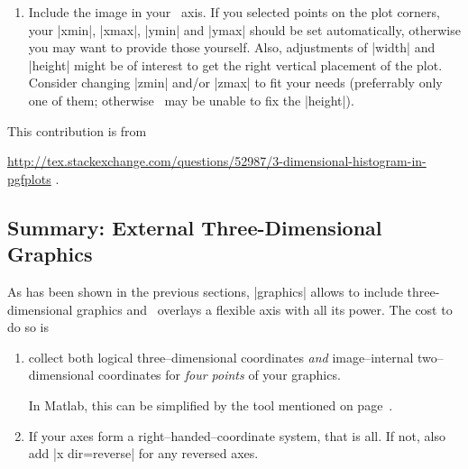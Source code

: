 {{\begin{enumerate}
\begin{codeexample}[code only]
currentScreenUnits=get(gcf,'Units')     %
currentPaperUnits=get(gcf,'PaperUnits') %
set(gcf,'Units',currentPaperUnits)      %
plotPosition=get(gcf,'Position')        %
set(gcf,'PaperSize',plotPosition(3:4))  %
set(gcf,'Units',currentScreenUnits)     %

print -dpdf matlabout      %
\end{codeexample}
\item Include the image in your \PGFPlots\ axis. If you selected points on the plot corners, your |xmin|, |xmax|, |ymin| and |ymax| should be set automatically, otherwise you may want to provide those yourself. Also, adjustments of |width| and |height| might be of interest to get the right vertical placement of the plot. Consider changing |zmin| and/or |zmax| to fit your needs (preferrably only one of them; otherwise \PGFPlots\ may be unable to fix the |height|).
\end{enumerate}

This contribution is from

\noindent
\url{http://tex.stackexchange.com/questions/52987/3-dimensional-histogram-in-pgfplots} .



\subsection*{Summary: External Three-Dimensional Graphics}
As has been shown in the previous sections,  |graphics| allows to include three-dimensional graphics and \PGFPlots\ overlays a flexible axis with all its power. The cost to do so is
\begin{enumerate}
	\item collect both logical three--dimensional coordinates \emph{and} image--internal two--dimensional coordinates for \emph{four points} of your graphics.

	In Matlab, this can be simplified by the tool mentioned on page~\pageref{sec:plotgraphics3d:matlabscript}.

	\item If your axes form a right--handed--coordinate system, that is all. If not, also add |x dir=reverse| for any reversed axes.
\end{enumerate}

}}
